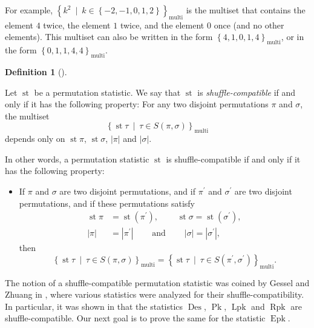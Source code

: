 \documentclass[numbers=enddot,12pt,final,onecolumn,notitlepage]{scrartcl}%
\theoremstyle{definition}
\newtheorem{defi}[theo]{Definition}
\newenvironment{definition}[1][]
{\begin{defi}[#1]\begin{leftbar}}
{\end{leftbar}\end{defi}}
\begin{document}
For example, $\left\{  k^{2}\ \mid\ k\in\left\{  -2,-1,0,1,2\right\}
\right\}  _{\operatorname*{multi}}$ is the multiset that contains the element
$4$ twice, the element $1$ twice, and the element $0$ once (and no other
elements). This multiset can also be written in the form $\left\{
4,1,0,1,4\right\}  _{\operatorname*{multi}}$, or in the form $\left\{
0,1,1,4,4\right\}  _{\operatorname*{multi}}$.

\begin{definition}
Let $\operatorname{st}$ be a permutation statistic. We say that
$\operatorname{st}$ is \textit{shuffle-compatible} if and only if it has the
following property: For any two disjoint permutations $\pi$ and $\sigma$, the
multiset%
\[
\left\{  \operatorname{st} \tau \ \mid\ \tau\in S\left(
\pi,\sigma\right)  \right\}  _{\operatorname*{multi}}%
\]
depends only on $\operatorname{st} \pi$, $\operatorname{st} \sigma$,
$\left\vert \pi\right\vert $ and $\left\vert \sigma\right\vert $.
\end{definition}

In other words, a permutation statistic $\operatorname{st}$ is
shuffle-compatible if and only if it has the following property:

\begin{itemize}
\item If $\pi$ and $\sigma$ are two disjoint permutations, and if $\pi
^{\prime}$ and $\sigma^{\prime}$ are two disjoint permutations, and if these
permutations satisfy
\begin{align*}
\operatorname{st} \pi    &  =\operatorname{st}\left(
\pi^{\prime}\right)  ,\ \ \ \ \ \ \ \ \ \ \operatorname{st}
\sigma =\operatorname{st}\left(  \sigma^{\prime}\right)  ,\\
\left\vert \pi\right\vert  &  =\left\vert \pi^{\prime}\right\vert
\ \ \ \ \ \ \ \ \ \ \text{and}\ \ \ \ \ \ \ \ \ \ \left\vert \sigma\right\vert
=\left\vert \sigma^{\prime}\right\vert ,
\end{align*}
then
\[
\left\{  \operatorname{st} \tau   \ \mid\ \tau\in S\left(
\pi,\sigma\right)  \right\}  _{\operatorname*{multi}}=\left\{
\operatorname{st} \tau   \ \mid\ \tau\in S\left(  \pi^{\prime
},\sigma^{\prime}\right)  \right\}  _{\operatorname*{multi}}.
\]

\end{itemize}

The notion of a shuffle-compatible permutation statistic was coined by Gessel
and Zhuang in \cite{part1}, where various statistics were analyzed for their
shuffle-compatibility. In particular, it was shown in \cite{part1} that the
statistics $\operatorname{Des}$, $\operatorname*{Pk}$, $\operatorname*{Lpk}$
and $\operatorname*{Rpk}$ are shuffle-compatible. Our next goal is to prove
the same for the statistic $\operatorname{Epk}$.
\end{document}
